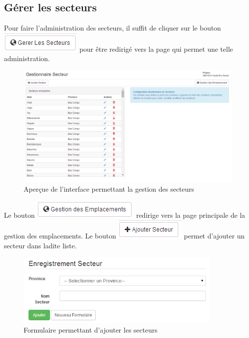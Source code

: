 \documentclass[12pt,a4paper]{report}
\begin{document}
\subsection{Gérer les secteurs}
Pour faire l'administration des secteurs, il suffit de cliquer sur le bouton \includegraphics[scale=0.7]{pic/AdminSecteur.png} pour être redirigé vers la page qui permet une telle administration.

\begin{figure}[h]
\begin{center}
\includegraphics[width=12cm]{pic/FormulaireGestionSecteur.png}
\end{center}
\caption{Aperçue de l'interface permettant la gestion des secteurs}
\label{Aperçue de l'interface permettant la gestion des secteurs}
\end{figure}

Le bouton \includegraphics[scale=0.7]{pic/GestionEmplacement.png} redirige vers la page principale de la gestion des emplacements.
Le bouton \includegraphics[scale=0.7]{pic/AddSecteur.png} permet d'ajouter un secteur dans ladite liste.

\begin{figure}[h]
\begin{center}
\includegraphics[width=10cm]{pic/FormAddSecteur.png}
\end{center}
\caption{Formulaire permettant d'ajouter les secteurs}
\label{Formulaire permettant d'ajouter les secteurs}
\end{figure}
\end{document}
